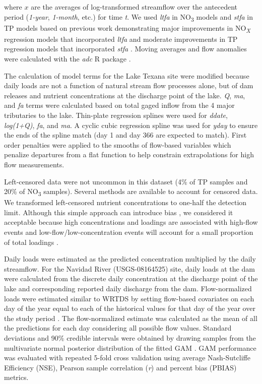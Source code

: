 \documentclass[fleqn,10pt,lineno]{wlpeerj} %
\begin{document}
where \(x\) are the averages of log-transformed streamflow over the
antecedent period (\emph{1-year}, \emph{1-month}, etc.) for time
\emph{t}. We used \emph{ltfa} in NO\textsubscript{3} models and
\emph{stfa} in TP models based on previous work demonstrating major
improvements in NO\textsubscript{\emph{X}} regression models that
incorporated \emph{ltfa} and moderate improvements in TP regression
models that incorporated \emph{stfa} \autocite{zhang_improving_2017}.
Moving averages and flow anomalies were calculated with the \emph{adc} R
package \autocite{schrammAdcCalculateAntecedant2023}.

The calculation of model terms for the Lake Texana site were modified
because daily loads are not a function of natural stream flow processes
alone, but of dam releases and nutrient concentrations at the discharge
point of the lake. \emph{Q}, \emph{ma}, and \emph{fa} terms were
calculated based on total gaged inflow from the 4 major tributaries to
the lake. Thin-plate regression splines were used for \emph{ddate},
\emph{log(1+Q)}, \emph{fa}, and \emph{ma}. A cyclic cubic regression
spline was used for \emph{yday} to ensure the ends of the spline match
(day 1 and day 366 are expected to match). First order penalties were
applied to the smooths of flow-based variables which penalize departures
from a flat function to help constrain extrapolations for high flow
measurements.

Left-censored data were not uncommon in this dataset (4\% of TP samples
and 20\% of NO\textsubscript{3} samples). Several methods are available
to account for censored data. We transformed left-censored nutrient
concentrations to one-half the detection limit. Although this simple
approach can introduce bias
\autocite{hornungEstimationAverageConcentration1990}, we considered it
acceptable because high concentrations and loadings are associated with
high-flow events and low-flow/low-concentration events will account for
a small proportion of total loadings
\autocite{mcdowell_implications_2021}.

Daily loads were estimated as the predicted concentration multiplied by
the daily streamflow. For the Navidad River (USGS-08164525) site, daily
loads at the dam were calculated from the discrete daily concentration
at the discharge point of the lake and corresponding reported daily
discharge from the dam. Flow-normalized loads were estimated similar to
WRTDS by setting flow-based covariates on each day of the year equal to
each of the historical values for that day of the year over the study
period \autocite{hirschWeightedRegressionsTime2010}. The flow-normalized
estimate was calculated as the mean of all the predictions for each day
considering all possible flow values. Standard deviations and 90\%
credible intervals were obtained by drawing samples from the
multivariate normal posterior distribution of the fitted GAM
\autocite{woodConfidenceIntervalsGeneralized2006,marraCoveragePropertiesConfidence2012,mcdowell_implications_2021}.
GAM performance was evaluated with repeated 5-fold cross validation
\autocite{burmanComparativeStudyOrdinary1989} using average
Nash-Sutcliffe Efficiency (NSE), Pearson sample correlation (\emph{r})
and percent bias (PBIAS) metrics.
\end{document}
